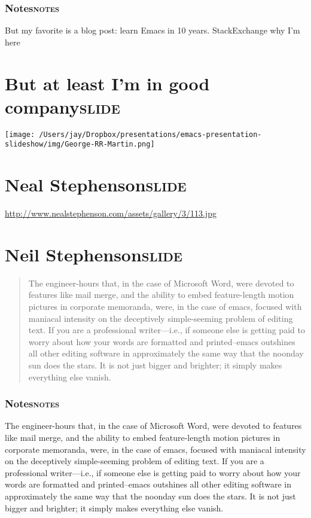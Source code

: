 \documentclass[11pt]{article}
\begin{document}
\subsubsection{Notes\hfill{}\textsc{notes}}
\label{sec:orgheadline37}
But my favorite is a blog post: learn Emacs in 10 years.
StackExchange
why I'm here 

\section{But at least I'm in good company\hfill{}\textsc{slide}}
\label{sec:orgheadline39}
\texttt{[image: /Users/jay/Dropbox/presentations/emacs-presentation-slideshow/img/George-RR-Martin.png]} 

\section{Neal Stephenson\hfill{}\textsc{slide}}
\label{sec:orgheadline40}
\url{http://www.nealstephenson.com/assets/gallery/3/113.jpg} 

\section{Neil Stephenson\hfill{}\textsc{slide}}
\label{sec:orgheadline42}
\begin{quote}
The engineer-hours that, in the case of Microsoft Word, were devoted to features like mail merge, and the ability to embed feature-length motion pictures in corporate memoranda, were, in the case of emacs, focused with maniacal intensity on the deceptively simple-seeming problem of editing text. If you are a professional writer---i.e., if someone else is getting paid to worry about how your words are formatted and printed--emacs outshines all other editing software in approximately the same way that the noonday sun does the stars. It is not just bigger and brighter; it simply makes everything else vanish.
\end{quote}

\subsubsection{Notes\hfill{}\textsc{notes}}
\label{sec:orgheadline41}
The engineer-hours that, in the case of Microsoft Word, were devoted to features like mail merge, and the ability to embed feature-length motion pictures in corporate memoranda, were, in the case of emacs, focused with maniacal intensity on the deceptively simple-seeming problem of editing text. If you are a professional writer---i.e., if someone else is getting paid to worry about how your words are formatted and printed--emacs outshines all other editing software in approximately the same way that the noonday sun does the stars. It is not just bigger and brighter; it simply makes everything else vanish. 
\end{document}
